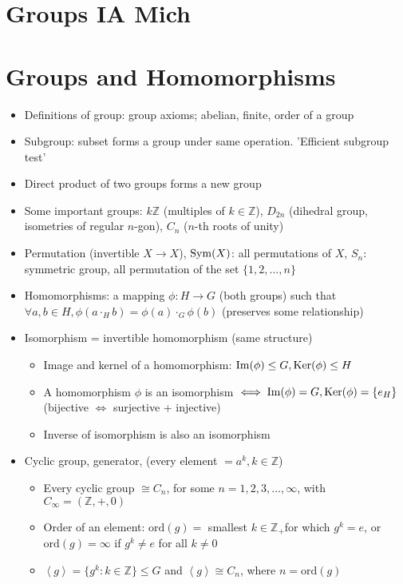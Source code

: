 



\section*{Groups \hfill IA Mich}

\section{Groups and Homomorphisms}
\begin{itemize}
      \item Definitions of group: group axioms; abelian, finite, order of a group
      \item Subgroup: subset forms a group under same operation.
            'Efficient subgroup test'
      \item Direct product of two groups forms a new group
      \item Some important groups: $k\mathbb{Z}$ (multiples of $k\in\mathbb{Z}$),
            $D_{2n}$ (dihedral group, isometries of regular $n$-gon), $C_{n}$ ($n$-th
            roots of unity)
      \item Permutation (invertible $X\to X$), $\operatorname{Sym}(X)$: all permutations of
            $X$, $S_{n}$: symmetric group, all permutation of the set $\{1,2,...,n\}$
      \item Homomorphisms: a mapping $\phi:H\to G$ (both groups) such that $\forall a,b\in H,\phi(a\cdot_{H}b)=\phi(a)\cdot_{G}\phi(b)$
            (preserves some relationship)
      \item Isomorphism = invertible homomorphism (same structure)
            \begin{itemize}
                  \item Image and kernel of a homomorphism: $\operatorname{Im}(\phi)\leq G,\operatorname{Ker}(\phi)\leq H$
                  \item A homomorphism $\phi$ is an isomorphism $\iff \operatorname{Im}(\phi)=G, \operatorname{Ker} (\phi) = \{e_{H}\}$ \\
                        (bijective $\iff$ surjective + injective)
                  \item Inverse of isomorphism is also an isomorphism
            \end{itemize}
      \item Cyclic group, generator, (every element $=a^{k},k\in\mathbb{Z}$)
            \begin{itemize}
                  \item Every cyclic group $\cong C_{n}$, for some $n=1,2,3,...,\infty$,
                        with $C_{\infty}=(\mathbb{Z},+,0)$
                  \item Order of an element: $\textrm{ord}(g)=$ smallest $k\in\mathbb{Z_{+}}$for
                        which $g^{k}=e$, or $\textrm{ord}(g)=\infty$ if $g^{k}\neq e$ for
                        all $k\neq0$
                  \item $\left\langle g\right\rangle =\{g^{k}:k\in\mathbb{Z}\}\leq G$ and
                        $\left\langle g\right\rangle \cong C_{n}$, where $n=\textrm{ord}(g)$
            \end{itemize}
\end{itemize}

